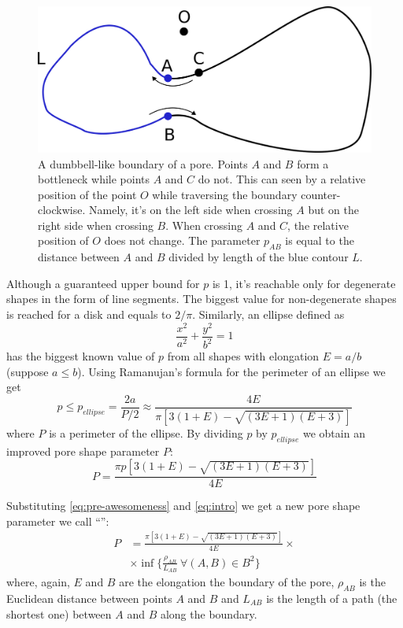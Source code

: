 \documentclass[reprint,amsmath,amssymb,aps,pre,showkeys,showpacs]{revtex4-1}
\newcommand{\highlight}[1]{{\color{red}{#1}}} %
\begin{document}
\begin{figure}
  \centering
  \includegraphics[width=0.9\linewidth]{images/parameter.png}
  \caption[]{A dumbbell-like boundary of a pore. Points $A$ and $B$ form a
    bottleneck while points $A$ and $C$ do not. This can seen by a relative
    position of the point $O$ while traversing the boundary
    counter-clockwise. Namely, it's on the left side when crossing $A$ but on
    the right side when crossing $B$. When crossing $A$ and $C$, the relative
    position of $O$ does not change. The parameter $p_{AB}$ is equal to the
    distance between $A$ and $B$ divided by length of the blue contour $L$.}
  \label{fig:parameter}
\end{figure}

Although a guaranteed upper bound for $p$ is 1, it's reachable only for
degenerate shapes in the form of line segments. The biggest value for
non-degenerate shapes is reached for a disk and equals to $2/\pi$. Similarly, an
ellipse defined as
\begin{equation*}
  \frac{x^2}{a^2} + \frac{y^2}{b^2} = 1
\end{equation*}
has the biggest known value of $p$ from all shapes with elongation $E = a / b$
(suppose $a \le b$). Using Ramanujan's formula for the perimeter of an ellipse
we get
\begin{equation*}
  p \le p_{ellipse} = \frac{2a}{P/2} \approx \frac{4E}{\pi[3(1+E) - \sqrt{(3E+1)(E+3)}]}
\end{equation*}
where $P$ is a perimeter of the ellipse. By dividing $p$ by $p_{ellipse}$ we
obtain an improved pore shape parameter $P$:
\begin{equation*}
  P = \frac{\pi p [3(1+E) - \sqrt{(3E+1)(E+3)}]}{4E}
\end{equation*}

Substituting \cref{eq:pre-awesomeness} and \cref{eq:intro} we get a new pore
shape parameter we call ``\highlight{awesomeness}'':
\begin{equation}
  \begin{aligned}
    P &= \frac{\pi [3(1+E) - \sqrt{(3E+1)(E+3)}]}{4E} \times \\
    & \times \inf \{\frac{\rho_{AB}}{L_{AB}} \ \forall (A, B) \in B^2\}
  \end{aligned}
  \label{eq:awesomeness}
\end{equation}
where, again, $E$ and $B$ are the elongation the boundary of the pore,
$\rho_{AB}$ is the Euclidean distance between points $A$ and $B$ and $L_{AB}$ is
the length of a path (the shortest one) between $A$ and $B$ along the boundary.
\end{document}

